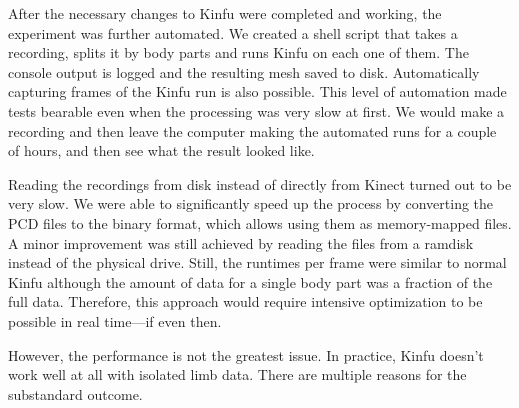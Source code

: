After the necessary changes to Kinfu were completed and working, the experiment was further automated. We created a shell script that takes a recording, splits it by body parts and runs Kinfu on each one of them. The console output is logged and the resulting mesh saved to disk. Automatically capturing frames of the Kinfu run is also possible. This level of automation made tests bearable even when the processing was very slow at first. We would make a recording and then leave the computer making the automated runs for a couple of hours, and then see what the result looked like.

Reading the recordings from disk instead of directly from Kinect turned out to be very slow. We were able to significantly speed up the process by converting the PCD files to the binary format, which allows using them as memory-mapped files. A minor improvement was still achieved by reading the files from a ramdisk instead of the physical drive. Still, the runtimes per frame were similar to normal Kinfu although the amount of data for a single body part was a fraction of the full data. Therefore, this approach would require intensive optimization to be possible in real time---if even then.

However, the performance is not the greatest issue. In practice, Kinfu doesn't work well at all with isolated limb data. There are multiple reasons for the substandard outcome.

